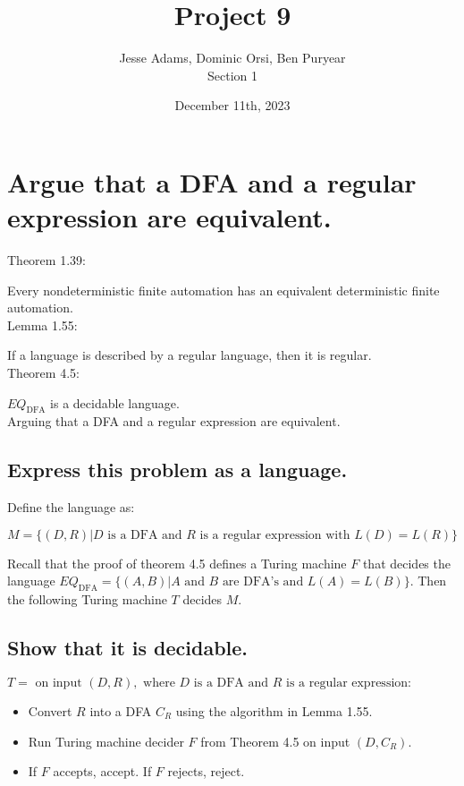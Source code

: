 \documentclass{article}
\title{Project 9}
\author{Jesse Adams, Dominic Orsi, Ben Puryear\\Section 1}
\date{December 11th, 2023}
\begin{document}
\maketitle

\section{Argue that a DFA and a regular expression are equivalent.}

Theorem 1.39:

Every nondeterministic finite automation has an equivalent deterministic finite automation.
\\
Lemma 1.55:

If a language is described by a regular language, then it is regular.
\\
Theorem 4.5:

$EQ_\text{DFA}$ is a decidable language.
\\
Arguing that a DFA and a regular expression are equivalent.

\subsection{Express this problem as a language.}

Define the language as:

$M = \{(D, R) | D \text{ is a DFA and } R \text{ is a regular expression with } L(D) = L(R)\}$

Recall that the proof of theorem 4.5 defines a Turing machine $F$ that decides the language $EQ_\text{DFA} = \{(A, B) | A \text{ and } B \text{ are DFA's and } L(A) = L(B)\}$.
Then the following Turing machine $T$ decides $M$.

\subsection{Show that it is decidable.}

$ T = \text{ on input } (D, R), \text{ where } D \text{ is a DFA and } R \text{ is a regular expression:}$

\begin{itemize}
    \item Convert $R$ into a DFA $C_R$ using the algorithm in Lemma 1.55.
    \item Run Turing machine decider $F$ from Theorem 4.5 on input $(D, C_R)$.
    \item If $F$ accepts, accept. If $F$ rejects, reject.
\end{itemize}
\end{document}
